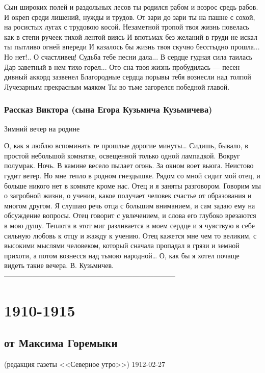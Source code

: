 \documentclass[]{memoir}
\begin{document}
Сын широких полей и раздольных лесов ты родился рабом и возрос средь рабов. И окреп среди лишений, нужды и трудов.
От зари до зари ты на пашне с сохой, на росистых лугах с трудовою косой. 
Незаметной тропой твоя жизнь повелась как в степи ручеек тихой лентой виясь
И впотьмах без желаний в груди не искал ты пытливо огней впереди
И казалось бы жизнь твоя скучно бесстыдно прошла...
Но нет!..  О счастливец! Судьба тебе песни дала...
В сердце гудная сила таилась Дар заветный в нем тихо горел... Ото сна твоя жизнь пробудилась --- песен дивный аккорд зазвенел
Благородные сердца порывы тебя вознесли над толпой Лучезарным прекрасным маяком
Ты во тьме загорелся победной главой. 


\subsection{Рассказ Виктора (сына Егора Кузьмича Кузьмичева)}

Зимний вечер на родине

О, как я люблю вспоминать те прошлые дорогие минуты…
Сидишь, бывало, в простой небольшой комнатке, освещенной только одной лампадкой. Вокруг полумрак. Ночь. В камине весело пылает огонь. За окном воет вьюга. Неистово гудит ветер. Но мне тепло в родном гнездышке. Рядом со мной сидит мой отец, и больше никого нет в комнате  кроме нас. Отец и я заняты разговором. Говорим мы о загробной жизни, о учении, какое получает человек счастье от образования и многом другом. Я слушаю речь отца с большим вниманием, и сам задаю ему на обсуждение вопросы. Отец говорит с увлечением, и слова его глубоко врезаются в мою душу. Теплота в этот миг разливается в моем сердце и я чувствую в себе сильную любовь к отцу и жажду к учению. Отец кажется мне чем то великим, с высокими мыслями человеком, который сначала пропадал в грязи и земной прихоти, а потом вознесся над тьмою народной…
О, как бы я хотел почаще видеть такие вечера. 
В. Кузьмичев.
------------------------------------------------------------------------


\chapter{1910-1915}

\section{от Максима Горемыки}
(редакция газеты <<Северное утро>>)
{1912-02-27}
\end{document}
